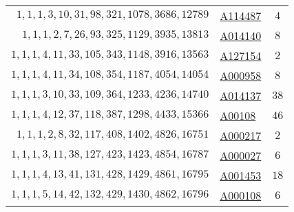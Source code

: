 \begin{longtabu}{|r|l|c|}
    \(1,    1,    1,    3,   10,   31,   98,  321, 1078, 3686, 12789\)  & \href{http://oeis.org/A114487}{A114487} &\(4\)\\
    \(1,    1,    1,    2,    7,   26,   93,  325, 1129, 3935, 13813\)  & \href{http://oeis.org/A014140}{A014140} &\(8\)\\
    \(1,    1,    1,    4,   11,   33,  105,  343, 1148, 3916, 13563\)  & \href{http://oeis.org/A127154}{A127154} &\(2\)\\
    \(1,    1,    1,    4,   11,   34,  108,  354, 1187, 4054, 14054\)  & \href{http://oeis.org/A000958}{A000958} &\(8\)\\
    \(1,    1,    1,    3,   10,   33,  109,  364, 1233, 4236, 14740\)  & \href{http://oeis.org/A014137}{A014137} &\(38\)\\
    \(1,    1,    1,    4,   12,   37,  118,  387, 1298, 4433, 15366\)  & \href{http://oeis.org/A00108}{A00108} &\(46\)\\
    \(1,    1,    1,    2,    8,   32,  117,  408, 1402, 4826, 16751\)  & \href{http://oeis.org/A000217}{A000217} &\(2\)\\
    \(1,    1,    1,    3,   11,   38,  127,  423, 1423, 4854, 16787\)  & \href{http://oeis.org/A000027}{A000027} &\(6\)\\
    \(1,    1,    1,    4,   13,   41,  131,  428, 1429, 4861, 16795\)  & \href{http://oeis.org/A001453}{A001453} &\(18\)\\
    \(1,    1,    1,    5,   14,   42,  132,  429, 1430, 4862, 16796\)  & \href{http://oeis.org/A000108}{A000108} &\(6\)\\
    \hline
\end{longtabu}

